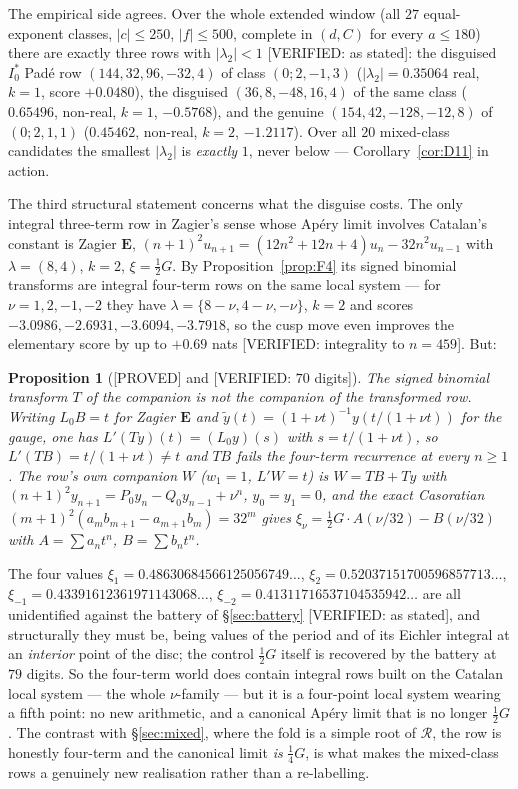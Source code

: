 \documentclass[11pt,reqno]{amsart}
\theoremstyle{plain}
\newtheorem{proposition}[theorem]{Proposition}
\theoremstyle{definition}
\theoremstyle{remark}
\theoremstyle{plain}
\newcommand{\Rc}{\mathcal R}
\newcommand{\Proved}{\textup{\textsf{[PROVED]}}}
\newcommand{\Verified}[1]{\textup{\textsf{[VERIFIED: #1]}}}
\begin{document}
The empirical side agrees. Over the whole extended window (all $27$
equal-exponent classes, $|c|\le250$, $|f|\le500$, complete in $(d,C)$ for every
$a\le180$) there are exactly three rows with $|\lambda_2|<1$ \Verified{as
stated}: the disguised $I_0^*$ Pad\'e row $(144,32,96,-32,4)$ of class
$(0;2,-1,3)$ ($|\lambda_2|=0.35064$ real, $k=1$, score $+0.0480$), the disguised
$(36,8,-48,16,4)$ of the same class ($0.65496$, non-real, $k=1$, $-0.5768$), and
the genuine $(154,42,-128,-12,8)$ of $(0;2,1,1)$ ($0.45462$, non-real, $k=2$,
$-1.2117$). Over all $20$ mixed-class candidates the smallest $|\lambda_2|$ is
\emph{exactly} $1$, never below --- Corollary~\ref{cor:D11} in action.

The third structural statement concerns what the disguise costs. The only
integral three-term row in Zagier's sense whose Ap\'ery limit involves Catalan's
constant is Zagier $\mathbf E$,
$(n+1)^2u_{n+1}=(12n^2+12n+4)u_n-32n^2u_{n-1}$ with $\lambda=(8,4)$, $k=2$,
$\xi=\tfrac12G$. By Proposition~\ref{prop:F4} its signed binomial transforms are
integral four-term rows on the same local system --- for $\nu=1,2,-1,-2$ they
have $\lambda=\{8-\nu,4-\nu,-\nu\}$, $k=2$ and scores
$-3.0986,-2.6931,-3.6094,-3.7918$, so the cusp move even improves the elementary
score by up to $+0.69$ nats \Verified{integrality to $n=459$}. But:

\begin{proposition}[\Proved{} and \Verified{$70$ digits}]\label{prop:D4}
The signed binomial transform $T$ of the companion is \emph{not} the companion of
the transformed row. Writing $L_0B=t$ for Zagier $\mathbf E$ and
$\tilde y(t)=(1+\nu t)^{-1}y(t/(1+\nu t))$ for the gauge, one has
$L'(Ty)(t)=(L_0y)(s)$ with $s=t/(1+\nu t)$, so $L'(TB)=t/(1+\nu t)\ne t$ and $TB$
fails the four-term recurrence at every $n\ge1$. The row's own companion $W$
\textup{(}$w_1=1$, $L'W=t$\textup{)} is $W=TB+Ty$ with
$(n+1)^2y_{n+1}=P_0y_n-Q_0y_{n-1}+\nu^n$, $y_0=y_1=0$, and the exact Casoratian
$(m+1)^2(a_mb_{m+1}-a_{m+1}b_m)=32^m$ gives
$\xi_\nu=\tfrac12G\cdot A(\nu/32)-B(\nu/32)$ with $A=\sum a_nt^n$,
$B=\sum b_nt^n$.
\end{proposition}

The four values $\xi_1=0.48630684566125056749\dots$,
$\xi_2=0.52037151700596857713\dots$, $\xi_{-1}=0.43391612361971143068\dots$,
$\xi_{-2}=0.41311716537104535942\dots$ are all unidentified against the battery
of \S\ref{sec:battery} \Verified{as stated}, and structurally they must be, being
values of the period and of its Eichler integral at an \emph{interior} point of
the disc; the control $\tfrac12G$ itself is recovered by the battery at $79$
digits. So the four-term world does contain integral rows built on the Catalan local
system --- the whole $\nu$-family --- but it is a four-point local system wearing
a fifth point: no new arithmetic, and a canonical Ap\'ery limit that is no longer
$\tfrac12G$. The contrast with \S\ref{sec:mixed}, where the fold is a simple root
of $\Rc$, the row is honestly four-term and the canonical limit \emph{is}
$\tfrac14G$, is what makes the mixed-class rows a genuinely new realisation
rather than a re-labelling.
\end{document}
